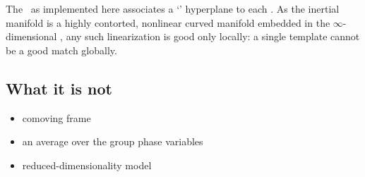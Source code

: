 The \mslices\ as implemented here associates a `\slice' hyperplane to each
\template. As the inertial manifold is a highly contorted, nonlinear
curved manifold embedded in the $\infty$-dimensional \statesp, any such
linearization is good only locally: a single template cannot be a good
match  globally.


\subsection{What it is not}
    \begin{itemize}
      \item comoving frame
      \item an average over the group phase variables
      \item reduced-dimensionality model
    \end{itemize}
